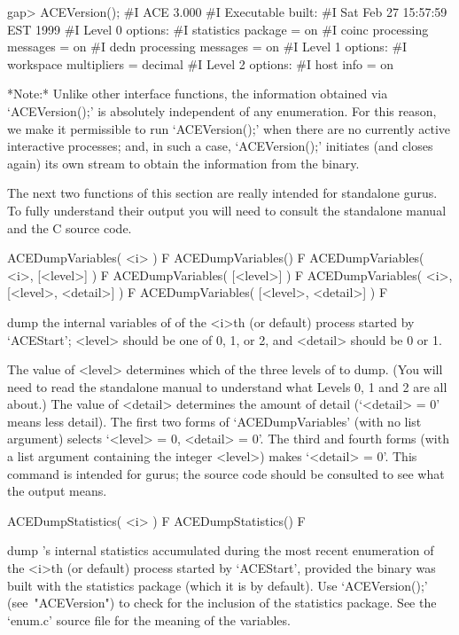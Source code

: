 \beginexample
gap> ACEVersion();
#I  ACE 3.000
#I  Executable built:
#I    Sat Feb 27 15:57:59 EST 1999
#I  Level 0 options:
#I    statistics package = on
#I    coinc processing messages = on
#I    dedn processing messages = on
#I  Level 1 options:
#I    workspace multipliers = decimal
#I  Level 2 options:
#I    host info = on
\endexample

*Note:*
Unlike other {\ACE} interface functions, the information obtained  via
`ACEVersion();' is absolutely independent of any enumeration. For this
reason, we make it permissible to run `ACEVersion();' when  there  are
no currently active interactive {\ACE} processes; and, in such a case,
`ACEVersion();' initiates (and closes again) its own stream to  obtain
the information from the {\ACE} binary.

The next two functions of this section are really intended for  {\ACE}
standalone gurus. To fully understand their output you  will  need  to
consult the standalone manual and the C source code.

\>ACEDumpVariables( <i> ) F
\>ACEDumpVariables() F
\>ACEDumpVariables( <i>, [<level>] ) F
\>ACEDumpVariables( [<level>] ) F
\>ACEDumpVariables( <i>, [<level>, <detail>] ) F
\>ACEDumpVariables( [<level>, <detail>] ) F

dump the internal variables  of  {\ACE}  of  the  <i>th  (or  default)
process started by `ACEStart'; <level> should be one of 0,  1,  or  2,
and <detail> should be 0 or 1.

The value of <level> determines which of the three levels of {\ACE} to
dump. (You will need to read the standalone manual to understand  what
Levels 0, 1 and 2 are all about.) The value of <detail> determines the
amount of detail (`<detail> = 0' means less  detail).  The  first  two
forms of `ACEDumpVariables' (with no list argument) selects `<level> =
0, <detail> = 0'. The third and fourth forms  (with  a  list  argument
containing the integer <level>) makes `<detail> = 0'. This command  is
intended for gurus; the source code should be consulted  to  see  what
the output means.

\>ACEDumpStatistics( <i> ) F
\>ACEDumpStatistics() F

dump {\ACE}'s internal statistics accumulated during the  most  recent
enumeration of the <i>th (or default) process started  by  `ACEStart',
provided the {\ACE} binary  was  built  with  the  statistics  package
(which it is by default). Use  `ACEVersion();'  (see~"ACEVersion")  to
check for the inclusion of the statistics package.  See  the  `enum.c'
source file for the meaning of the variables.


